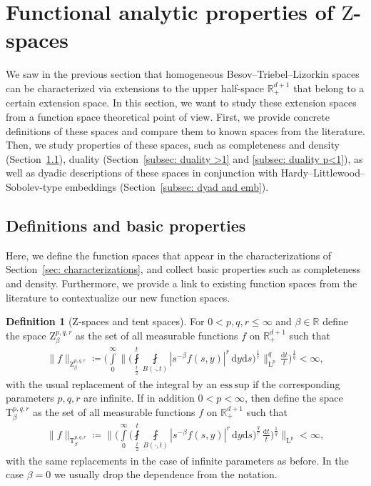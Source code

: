 \documentclass[11pt, leqno,parskip=half]{amsart}
\theoremstyle{definition}
\newtheorem{definition}[theorem]{Definition}
\newcommand{\IR}{\mathbb{R}}
\renewcommand{\L}{\mathrm{L}}
\renewcommand{\T}{\mathrm{T}}
\newcommand{\Z}{\mathrm{Z}}
\renewcommand{\d}{\mathrm{d}}
\newcommand{\esssup}{\mathrm{ess\, sup}}
\numberwithin{equation}{section}
\begin{document}
\section{Functional analytic properties of $\Z$-spaces}
\label{sec:Z_spaces}

\noindent We saw in the previous section that homogeneous Besov--Triebel--Lizorkin spaces can be characterized via extensions to the upper half-space $\IR^{d+1}_+$ that belong to a certain extension space. In this section, we want to study these extension spaces from a function space theoretical point of view. First, we provide concrete definitions of these spaces and compare them to known spaces from the literature. Then, we study properties of these spaces, such as completeness and density (Section~\ref{subsec: basic prop}), duality (Section~\ref{subsec: duality >1} and \ref{subsec: duality p<1}), as well as dyadic descriptions of these spaces in conjunction with Hardy--Littlewood--Sobolev-type embeddings (Section~\ref{subsec: dyad and emb}).

\subsection{Definitions and basic properties}
\label{subsec: basic prop}

Here, we define the function spaces that appear in the characterizations of Section~\ref{sec: characterizations}, and collect basic properties such as completeness and density. Furthermore, we provide a link to existing function spaces from the literature to contextualize our new function spaces.


\begin{definition}[$\Z$-spaces and tent spaces]
\label{def: function spaces}
    For $0<p,q,r\leq \infty$ and $\beta\in\IR$ define the space $\Z^{p,q,r}_\beta$ as the set of all measurable functions $f$ on $\IR^{d+1}_+$ such that
    \begin{align*}
        \|f\|_{\Z^{p,q,r}_\beta} \coloneqq \bigg(\int\limits_{0}^\infty \bigg\|\bigg(\fint\limits_{\frac{t}{2}}^t \fint\limits_{B(\cdot,t)} |s^{-\beta}f(s,y)|^r \, \d y \d s\bigg)^\frac{1}{r} \bigg\|_{\L^p}^q\,\frac{\d t}{t}\bigg)^\frac{1}{q}<\infty,
    \end{align*}
    with the usual replacement of the integral by an $\esssup$ if the corresponding parameters $p,q,r$ are infinite.
    If in addition $0<p< \infty$, then define the space $\T^{p,q,r}_\beta$ as the set of all measurable functions $f$ on $\IR^{d+1}_+$ such that
    \begin{align*}
        \|f\|_{\T^{p,q,r}_\beta} \coloneqq \bigg\| \bigg( \int\limits_0^\infty \bigg(\fint\limits_{\frac{t}{2}}^t \fint\limits_{B(\cdot,t)} |s^{-\beta}f(s,y)|^r \,\d y \d s\bigg)^\frac{q}{r}\,\frac{\d t}{t}\bigg)^\frac{1}{q} \bigg\|_{\L^p} < \infty,
    \end{align*}
    with the same replacements in the case of infinite parameters as before. In the case $\beta = 0$ we usually drop the dependence from the notation.
\end{definition}
\end{document}
